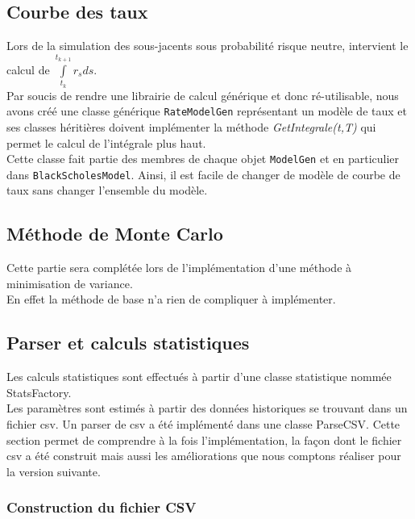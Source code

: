 \documentclass[a4paper,12pt]{article}
\begin{document}
\subsection{Courbe des taux}
Lors de la simulation des sous-jacents sous probabilité risque neutre, intervient le calcul de $\int\limits_{t_k}^{t_{k+1}}r_sds$. \\
Par soucis de rendre une librairie de calcul générique et donc ré-utilisable, nous avons créé une classe générique {\tt RateModelGen} représentant un modèle de taux et ses classes héritières doivent implémenter la méthode {\it GetIntegrale(t,T)} qui permet le calcul de l'intégrale plus haut. \\[1mm]Cette classe fait partie des membres de chaque objet {\tt ModelGen} et en particulier dans {\tt BlackScholesModel}. Ainsi, il est facile de changer de modèle de courbe de taux sans changer l'ensemble du modèle.
\newpage
\subsection{Méthode de Monte Carlo}
Cette partie sera complétée lors de l'implémentation d'une méthode à minimisation de variance. \\
En effet la méthode de base n'a rien de compliquer à implémenter.
\subsection{Parser et calculs statistiques}

Les calculs statistiques sont effectués à partir d'une classe statistique nommée StatsFactory.\\ Les paramètres sont estimés à partir des données historiques se trouvant dans un fichier csv. 
Un parser de csv a été implémenté dans une classe ParseCSV.
Cette section permet de comprendre à la fois l'implémentation, la façon dont le fichier csv a été construit mais aussi les améliorations que nous comptons réaliser pour la version suivante. 
\subsubsection{Construction du fichier CSV}
\end{document}
